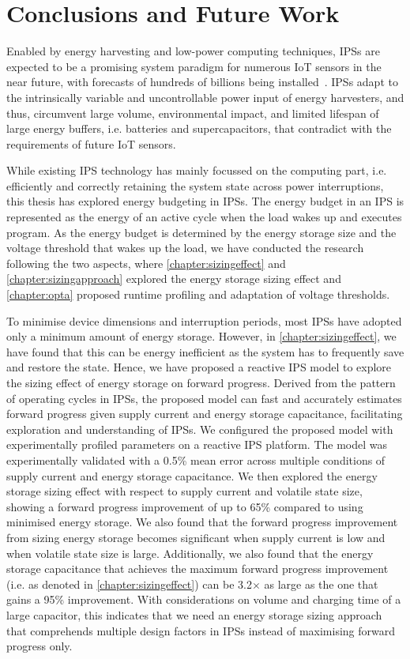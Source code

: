 \chapter{Conclusions and Future Work} \label{chapter:conclusion}

Enabled by energy harvesting and low-power computing techniques, IPSs are expected to be a promising system paradigm for numerous IoT sensors in the near future, with forecasts of hundreds of billions being installed~\cite{sparks2017trillion}.
IPSs adapt to the intrinsically variable and uncontrollable power input of energy harvesters, and thus, circumvent large volume, environmental impact, and limited lifespan of large energy buffers, i.e. batteries and supercapacitors, that contradict with the requirements of future IoT sensors.

While existing IPS technology has mainly focussed on the computing part, i.e. efficiently and correctly retaining the system state across power interruptions, this thesis has explored energy budgeting in IPSs. 
The energy budget in an IPS is represented as the energy of an active cycle when the load wakes up and executes program. 
As the energy budget is determined by the energy storage size and the voltage threshold that wakes up the load, we have conducted the research following the two aspects, where \cref{chapter:sizingeffect} and \cref{chapter:sizingapproach} explored the energy storage sizing effect and \cref{chapter:opta} proposed runtime profiling and adaptation of voltage thresholds. 

To minimise device dimensions and interruption periods, most IPSs have adopted only a minimum amount of energy storage. 
However, in \cref{chapter:sizingeffect}, we have found that this can be energy inefficient as the system has to frequently save and restore the state. 
Hence, we have proposed a reactive IPS model to explore the sizing effect of energy storage on forward progress. 
Derived from the pattern of operating cycles in IPSs, the proposed model can fast and accurately estimates forward progress given supply current and energy storage capacitance, facilitating exploration and understanding of IPSs. 
We configured the proposed model with experimentally profiled parameters on a reactive IPS platform.
The model was experimentally validated with a 0.5\% mean error across multiple conditions of supply current and energy storage capacitance. 
We then explored the energy storage sizing effect with respect to supply current and volatile state size, showing a forward progress improvement of up to 65\% compared to using minimised energy storage.
We also found that the forward progress improvement from sizing energy storage becomes significant when supply current is low and when volatile state size is large. 
Additionally, we also found that the energy storage capacitance that achieves the maximum forward progress improvement (i.e.  as denoted in \cref{chapter:sizingeffect}) can be 3.2$\times$ as large as the one that gains a 95\% improvement. 
With considerations on volume and charging time of a large capacitor, this indicates that we need an energy storage sizing approach that comprehends multiple design factors in IPSs instead of maximising forward progress only.


